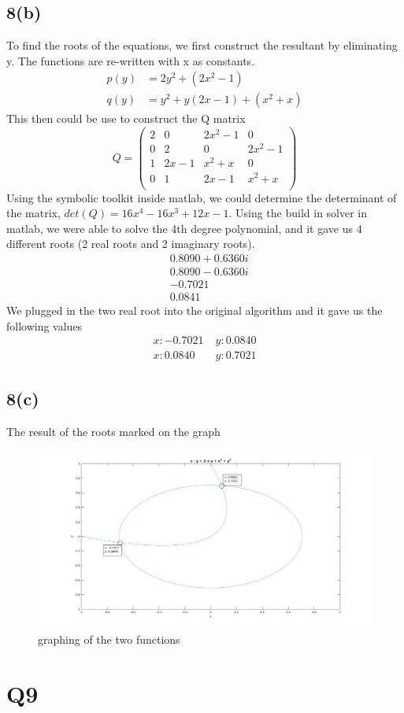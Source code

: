 \documentclass{article}
\begin{document}
\subsection{8(b)}
To find the roots of the equations, we first construct the resultant by eliminating y. The functions are re-written with x as constants.
\begin{equation*}
\begin{aligned}
p(y) &= 2y^2 + (2x^2-1)\\
q(y) &= y^2 + y(2x-1) + (x^2 +x)
\end{aligned}
\end{equation*}
This then could be use to construct the Q matrix
\begin{equation*}
Q = 
\begin{pmatrix}
2 & 0 & 2x^2-1 & 0\\
0 & 2 & 0 & 2x^2 -1 \\
1 & 2x-1 & x^2+x & 0 \\
0 & 1 & 2x-1 & x^2+x\\ 
\end{pmatrix}
\end{equation*}
Using the symbolic toolkit inside matlab, we could determine the determinant of the matrix, $det(Q) = 16x^4 - 16x^3 + 12x - 1$. Using the build in solver in matlab, we were able to solve the 4th degree polynomial, and it gave us 4 different roots (2 real roots and 2 imaginary roots).
\begin{equation*}
\begin{aligned}
   &0.8090 + 0.6360i\\
   &0.8090 - 0.6360i\\
  &-0.7021 \\
   &0.0841 
\end{aligned}
\end{equation*}
We plugged in the two real root into the original algorithm and it gave us the following values
\begin{equation*}
\begin{aligned}
	x: -0.7021 \;&y:0.0840\\
	x: 0.0840 \;&y:0.7021
\end{aligned}
\end{equation*}
\subsection{8(c)}
The result of the roots marked on the graph
\begin{figure}[H]
\centering
\includegraphics[width=5in]{p8-2.jpg}
\caption{graphing of the two functions}
\end{figure}
\section{Q9}
\end{document}
